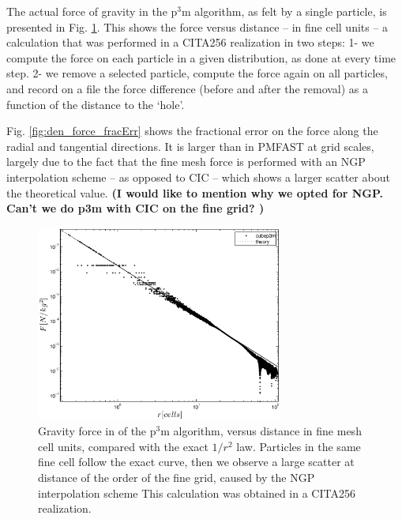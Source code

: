 The actual force of gravity in the p$^3$m algorithm,
as felt by a single particle, is presented in Fig. \ref{fig:den_force_ppext0}.
This shows the force versus distance -- in fine cell units -- a calculation that was performed in a CITA256 realization in two steps: 
1- we compute the force on each particle in a given distribution, as done at every time step.
2- we remove a selected particle, compute the force again on all particles, and record on a file the 
force difference (before  and after the removal) as a function of the distance to the `hole'.



Fig. \ref{fig:den_force_fracErr} shows the fractional error on the force along the radial and tangential directions.
It is larger than in {\small PMFAST} at grid scales, largely due to the fact that the fine mesh force is performed with an NGP interpolation scheme -- as opposed to CIC -- which shows a larger scatter about the theoretical value. {\bf (I would like to mention why we opted for NGP. Can't we do p3m with CIC on the fine grid? )}


\begin{figure}%
  \begin{center}
    \includegraphics[width=3.2in]{graphs/densityForce_ppext=0.eps}
  \caption{Gravity force in of the p$^3$m algorithm, versus distance in fine mesh cell units, compared with the exact $1/r^{2}$ law.
  Particles in the same fine cell follow the exact curve, then we observe a large scatter at 
  distance of the order of the fine grid, caused by the NGP interpolation scheme
  This calculation was obtained in a CITA256 realization. 
    \label{fig:den_force_ppext0}}
\end{center}
\end{figure}

